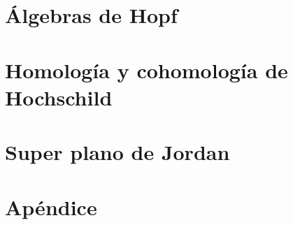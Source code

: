 \documentclass[a4paper,oneside,fleqn,11pt]{report}
\date{23/03/2015}
\theoremstyle{definition}
\theoremstyle{definition}
\theoremstyle{definition}
\begin{document}
\chapter{Álgebras de Hopf}


\chapter{Homología y cohomología de Hochschild}


\chapter{Super plano de Jordan}
\label{chap3}


\chapter{Apéndice}
\label{apendice}

\end{document}
